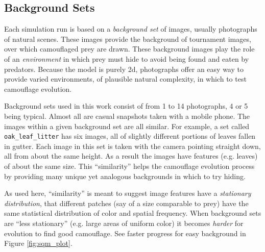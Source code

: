 \documentclass[letterpaper]{article}
\newcommand{\jargon}[1]{\textit{#1}}
\newcommand{\stt}[1]{{\small \texttt{#1}}}
\begin{document}
\subsection{Background Sets}
\label{subsec:background_sets}
Each simulation run is based on a \jargon{background set} of images, usually photographs of natural scenes. These images provide the background of tournament images, over which camouflaged prey are drawn. These background images play the role of an \jargon{environment} in which prey must hide to avoid being found and eaten by predators. Because the model is purely 2d, photographs offer an easy way to provide varied environments, of plausible natural complexity, in which to test camouflage evolution.
\par
Background sets used in this work consist of from 1 to 14 photographs, 4 or 5 being typical. Almost all are casual snapshots taken with a mobile phone. The images within a given background set are all similar. For example, a set called \stt{oak\_leaf\_litter} has six images, all of slightly different portions of leaves fallen in gutter. Each image in this set is taken with the camera pointing straight down, all from about the same height. As a result the images have features (e.g. leaves) of about the same size. This “similarity” helps the camouflage evolution process by providing many unique yet analogous backgrounds in which to try hiding.
\par
As used here, “similarity” is meant to suggest image features have a \jargon{stationary distribution}, that different patches (say of a size comparable to prey) have the same statistical distribution of color and spatial frequency. When background sets are “less stationary” (e.g. large areas of uniform color) it becomes \jargon{harder} for evolution to find good camouflage. See faster progress for easy background in Figure \ref{fig:sqm_plot}.
\par

\end{document}
